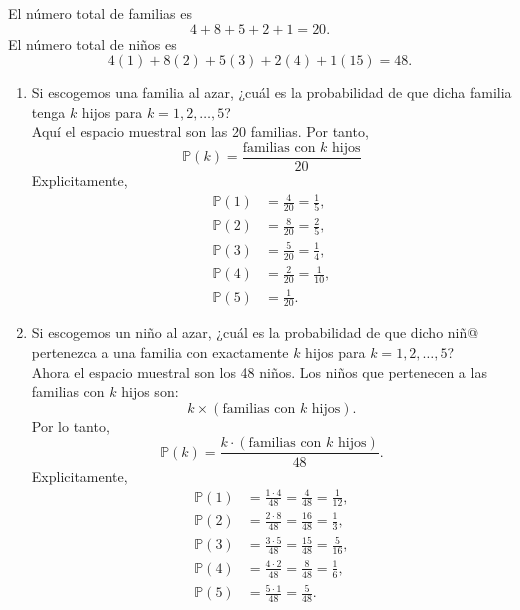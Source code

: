 \message{ !name(tarea2.tex)}\documentclass[12pt,a4paper]{article}
\begin{document}
    \begin{solucion}
        El número total de familias es
        \begin{equation*}
            4+8+5+2+1=20.
        \end{equation*}
        El número total de niños es
        \begin{equation*}
            4(1)+8(2)+5(3)+2(4)+1(15)=48.
        \end{equation*}
        \begin{enumerate}
            \item[(a)] Si escogemos una familia al azar, ¿cuál es la probabilidad de que dicha familia tenga $k$ hijos para $k=1,2,\dots,5$?\\
            Aquí el espacio muestral son las 20 familias. Por tanto,
            \begin{equation*}
                \mathbb{P}(k)=\frac{\text{familias con }k\text{ hijos}}{20}
            \end{equation*}
            Explicitamente,
            \begin{align*}
                \mathbb{P}(1)&=\frac{4}{20}=\frac{1}{5},\\
                \mathbb{P}(2)&=\frac{8}{20}=\frac{2}{5},\\
                \mathbb{P}(3)&=\frac{5}{20}=\frac{1}{4},\\
                \mathbb{P}(4)&=\frac{2}{20}=\frac{1}{10},\\
                \mathbb{P}(5)&=\frac{1}{20}.
            \end{align*}
            \item[(b)] Si escogemos un niño al azar, ¿cuál es la probabilidad de que dicho niñ@ pertenezca a una familia con exactamente $k$ hijos para $k=1,2,\dots,5$?\\
            Ahora el espacio muestral son los 48 niños. Los niños que pertenecen a las familias con $k$ hijos son:
            \begin{equation*}
                k\times(\text{familias con }k\text{ hijos}).
            \end{equation*}
            Por lo tanto,
            \begin{equation*}
                \mathbb{P}(k)=\frac{k\cdot(\text{familias con }k\text{ hijos})}{48}.
            \end{equation*}
            Explicitamente,
            \begin{align*}
                \mathbb{P}(1)&=\frac{1\cdot4}{48}=\frac{4}{48}=\frac{1}{12},\\
                \mathbb{P}(2)&=\frac{2\cdot8}{48}=\frac{16}{48}=\frac{1}{3},\\
                \mathbb{P}(3)&=\frac{3\cdot5}{48}=\frac{15}{48}=\frac{5}{16},\\
                \mathbb{P}(4)&=\frac{4\cdot2}{48}=\frac{8}{48}=\frac{1}{6},\\
                \mathbb{P}(5)&=\frac{5\cdot1}{48}=\frac{5}{48}.
            \end{align*}
        \end{enumerate}
    \end{solucion}
    
\end{document}
